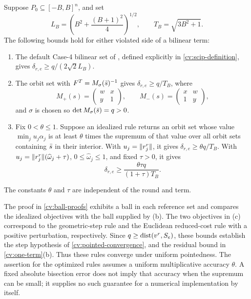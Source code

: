 \begin{lemma}\label{cv:rule-steps}
Suppose $P_0\subseteq[-B,B]^n$, and set
\[
 L_B=\left(B^2+\frac{(B+1)^2}{4}\right)^{1/2},\qquad
 T_B=\sqrt{3B^2+1}.
\]
The following bounds hold for either violated side of a bilinear term:
\begin{enumerate}[label=(\alph*)]
\item The default Case-4 bilinear set of \citet{ChmielaMunozSerrano2020ZIB}, defined explicitly in
      \cref{cv:scip-definition}, gives
      $\delta_{r,e}\ge q/(2\sqrt2 L_B)$.
\item The orbit set with $F^T=M_\sigma(\bar s)^{-1}$ gives
      $\delta_{r,e}\ge q/T_B$, where
      \[
      M_+(s)=\begin{pmatrix}w&x\\y&1\end{pmatrix},\qquad
      M_-(s)=\begin{pmatrix}x&w\\1&y\end{pmatrix},
      \]
      and $\sigma$ is chosen so $\det M_\sigma(\bar s)=q>0$.
\item Fix $0<\theta\le1$. Suppose an idealized rule returns an orbit set
      whose value $\min_j u_j\alpha_j$ is at least $\theta$ times the
      supremum of that value over all orbit sets containing $\bar s$ in
      their interior. With $u_j=\lVert r_j^r\rVert$, it gives
      $\delta_{r,e}\ge\theta q/T_B$. With
      $u_j=\lVert r_j^r\rVert(\widehat\omega_j+\tau)$,
      $0\le\widehat\omega_j\le1$, and fixed $\tau>0$, it gives
      \[
      \delta_{r,e}\ge
             \frac{\theta\tau q}{(1+\tau)T_B}.
      \]
\end{enumerate}
The constants $\theta$ and $\tau$ are independent of the round and term.
\end{lemma}

The proof in \cref{cv:ball-proofs} exhibits a ball in each reference set
and compares the idealized objectives with the ball supplied by (b).
The two objectives in (c) correspond to the geometric-step rule and the
Euclidean reduced-cost rule with a positive perturbation, respectively.
Since $q\ge\operatorname{dist}(v^r,S_e)$, these bounds establish the step hypothesis of
\cref{cv:pointed-convergence}, and the residual bound in
\cref{cv:one-term}(b). Thus these rules converge under uniform pointedness.
The assertion for the optimized rules assumes a uniform multiplicative
accuracy $\theta$. A fixed absolute bisection error does not imply that
accuracy when the supremum can be small; it supplies no such guarantee for
a numerical implementation by itself.


